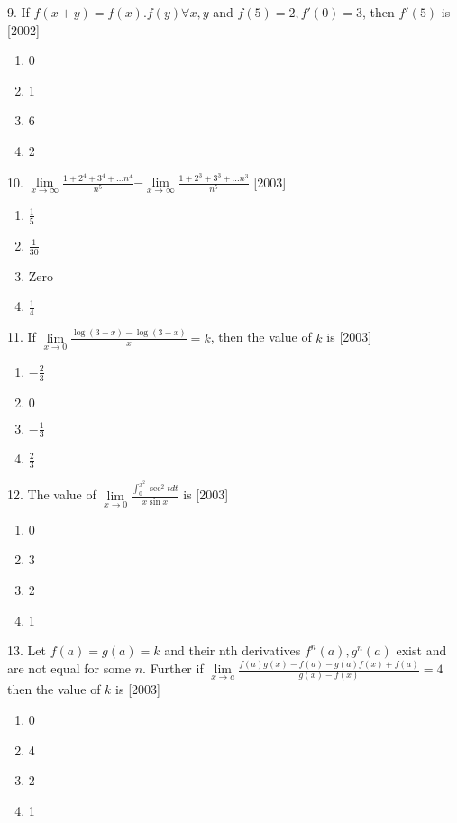\documentclass[journal,12pt,twocolumn]{IEEEtran}
\theoremstyle{remark}
\begin{document}
9. If $f(x+y)=f(x).f(y)\forall x,y$ and $f(5)=2,f'(0)=3$, then $f'(5)$ is \hfill [2002]

\begin{enumerate}
	\item 0
	\item 1
	\item 6
	\item 2\\[2pt]
\end{enumerate}

10. $\displaystyle\lim\limits_{x\to\infty}\frac{1+2^4+3^4+\dots n^4}{n^5}$$-$$\displaystyle\lim\limits_{x\to\infty}\frac{1+2^3+3^3+\dots n^3}{n^5}$ \hfill{[2003]}
\begin{enumerate}
    \item $\frac{1}{5}$
    \item $\frac{1}{30}$
    \item Zero
    \item $\frac{1}{4}$\\[2pt]
\end{enumerate}

11. If $\displaystyle \lim\limits_{x\to 0}\frac{\log(3+x)-\log(3-x)}{x} = k$, then the value of $k$ is \hfill{[2003]}
\begin{enumerate}
    \item $-\frac{2}{3}$
    \item $0$
    \item $-\frac{1}{3}$
    \item $\frac{2}{3}$\\[2pt]
\end{enumerate}

12. The value of $\displaystyle \lim\limits_{x\to 0}\frac{\int_{0}^{x^2} \sec^2tdt}{x\sin x}$ is \hfill [2003]
\begin{enumerate}
    \item 0 
    \item 3
    \item 2
    \item 1\\[2pt]
\end{enumerate}

13. Let $f(a)=g(a)=k$ and their nth derivatives $f^n(a),g^n(a)$ exist and are not equal for some $n$. Further if $\displaystyle \lim\limits_{x\to a}\frac{f(a)g(x)-f(a)-g(a)f(x)+f(a)}{g(x)-f(x)}=4$ then the value of $k$ is \hfill [2003]

\begin{enumerate}
    \item 0
    \item 4
    \item 2
    \item 1\\[2pt]
\end{enumerate}
\end{document}
